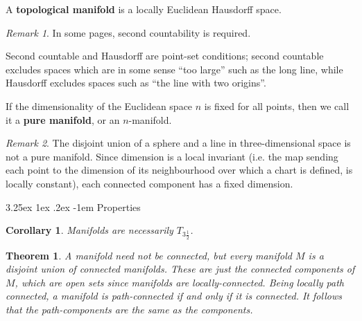 \documentclass[12pt, letterpaper]{article}
\makeatletter
\newtheorem{cor}[prop]{Corollary}
\newtheorem{thm}[prop]{Theorem}
\renewcommand\paragraph{\@startsection{paragraph}{4}{\z@}%
	{3.25ex \@plus1ex \@minus.2ex}%
	{-1em}%
	{\normalfont\normalsize\bfseries}}
\theoremstyle{definition}
\theoremstyle{remark}
\newtheorem*{rem*}{Remark}
\theoremstyle{definition}
\theoremstyle{plain}
\numberwithin{equation}{section}
\makeatother
\begin{document}
	\begin{def*}
		A \textbf{topological manifold} is a locally Euclidean Hausdorff space. 
	\end{def*}
	\begin{rem*}
		In some pages, second countability is required.
		
		Second countable and Hausdorff are point-set conditions;
		second countable excludes spaces which are in some sense ``too large'' such as the long line,
		while Hausdorff excludes spaces such as ``the line with two origins''.
	\end{rem*}

	
	\begin{def*}
		If the dimensionality of the Euclidean space $n$ is fixed for all points,
		then we call it a \textbf{pure manifold}, or an $n$-manifold.
	\end{def*}
	\begin{rem*}
		The disjoint union of a sphere and a line in three-dimensional space is not a pure manifold.
		Since dimension is a local invariant (i.e. the map sending each point to the dimension of its neighbourhood over which a chart is defined, is locally constant), each connected component has a fixed dimension.
	\end{rem*}

	\paragraph{Properties}
	\begin{cor}
		Manifolds are necessarily $T_{3\frac{1}{2}}$.
	\end{cor}

	\begin{thm}
		A manifold need not be connected, but every manifold $M$ is a disjoint union of connected manifolds.
		These are just the connected components of $M$, which are open sets since manifolds are locally-connected.
		Being locally path connected, a manifold is path-connected if and only if it is connected.
		It follows that the path-components are the same as the components.
	\end{thm}
\end{document}
